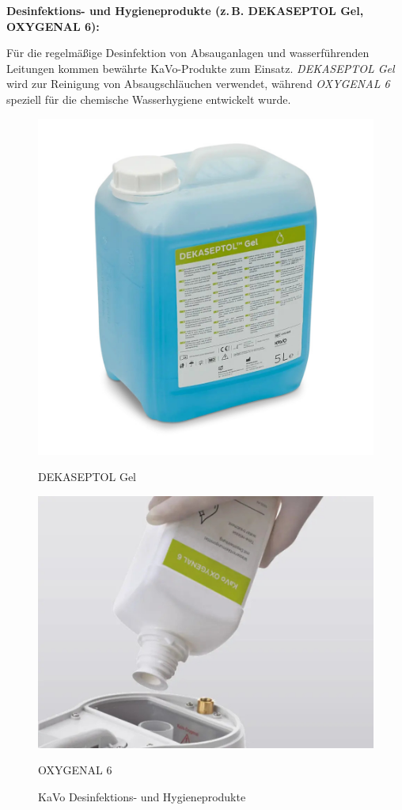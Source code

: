 \textbf{Desinfektions- und Hygieneprodukte (z.\,B. DEKASEPTOL Gel, OXYGENAL 6):}

Für die regelmäßige Desinfektion von Absauganlagen und wasserführenden Leitungen kommen bewährte KaVo-Produkte zum Einsatz. \textit{DEKASEPTOL Gel} wird zur Reinigung von Absaugschläuchen verwendet, während \textit{OXYGENAL 6} speziell für die chemische Wasserhygiene entwickelt wurde.

\begin{figure}[H]
  \centering
  \begin{minipage}[b]{0.40\textwidth}
    \centering
    \includegraphics[width=\textwidth]{images/DEKASEPTOL-Gel_Nachfuellkanister_2000px.jpg}
    \caption*{DEKASEPTOL Gel}
  \end{minipage}
  \hspace{0.05\textwidth}
  \begin{minipage}[b]{0.40\textwidth}
    \centering
    \includegraphics[width=\textwidth]{images/KaVo-Oxygenal_Handling_1000px.jpg}
    \caption*{OXYGENAL 6}
  \end{minipage}
  \caption{KaVo Desinfektions- und Hygieneprodukte}
  \label{fig:Hygieneprodukte}
\end{figure}
